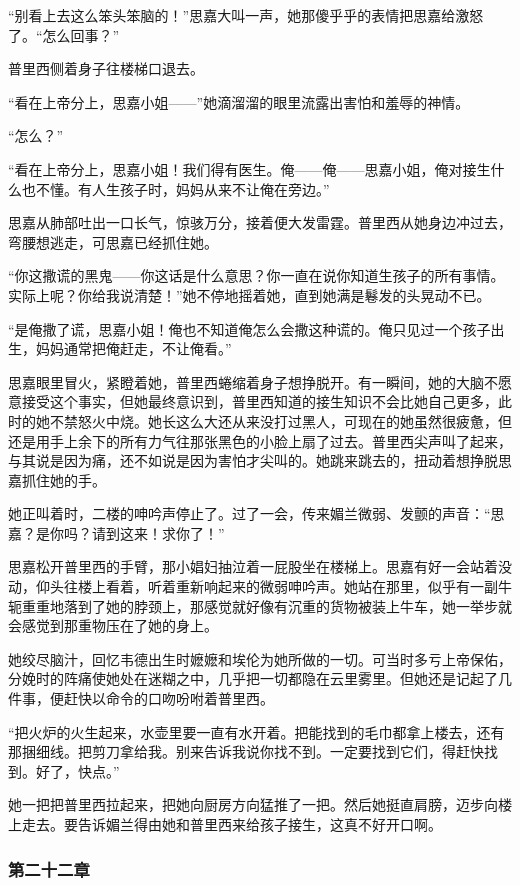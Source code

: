 \par “别看上去这么笨头笨脑的！”思嘉大叫一声，她那傻乎乎的表情把思嘉给激怒了。“怎么回事？”
\par 普里西侧着身子往楼梯口退去。
\par “看在上帝分上，思嘉小姐——”她滴溜溜的眼里流露出害怕和羞辱的神情。
\par “怎么？”
\par “看在上帝分上，思嘉小姐！我们得有医生。俺——俺——思嘉小姐，俺对接生什么也不懂。有人生孩子时，妈妈从来不让俺在旁边。”
\par 思嘉从肺部吐出一口长气，惊骇万分，接着便大发雷霆。普里西从她身边冲过去，弯腰想逃走，可思嘉已经抓住她。
\par “你这撒谎的黑鬼——你这话是什么意思？你一直在说你知道生孩子的所有事情。实际上呢？你给我说清楚！”她不停地摇着她，直到她满是鬈发的头晃动不已。
\par “是俺撒了谎，思嘉小姐！俺也不知道俺怎么会撒这种谎的。俺只见过一个孩子出生，妈妈通常把俺赶走，不让俺看。”
\par 思嘉眼里冒火，紧瞪着她，普里西蜷缩着身子想挣脱开。有一瞬间，她的大脑不愿意接受这个事实，但她最终意识到，普里西知道的接生知识不会比她自己更多，此时的她不禁怒火中烧。她长这么大还从来没打过黑人，可现在的她虽然很疲惫，但还是用手上余下的所有力气往那张黑色的小脸上扇了过去。普里西尖声叫了起来，与其说是因为痛，还不如说是因为害怕才尖叫的。她跳来跳去的，扭动着想挣脱思嘉抓住她的手。
\par 她正叫着时，二楼的呻吟声停止了。过了一会，传来媚兰微弱、发颤的声音：“思嘉？是你吗？请到这来！求你了！”
\par 思嘉松开普里西的手臂，那小娼妇抽泣着一屁股坐在楼梯上。思嘉有好一会站着没动，仰头往楼上看着，听着重新响起来的微弱呻吟声。她站在那里，似乎有一副牛轭重重地落到了她的脖颈上，那感觉就好像有沉重的货物被装上牛车，她一举步就会感觉到那重物压在了她的身上。
\par 她绞尽脑汁，回忆韦德出生时嬷嬷和埃伦为她所做的一切。可当时多亏上帝保佑，分娩时的阵痛使她处在迷糊之中，几乎把一切都隐在云里雾里。但她还是记起了几件事，便赶快以命令的口吻吩咐着普里西。
\par “把火炉的火生起来，水壶里要一直有水开着。把能找到的毛巾都拿上楼去，还有那捆细线。把剪刀拿给我。别来告诉我说你找不到。一定要找到它们，得赶快找到。好了，快点。”
\par 她一把把普里西拉起来，把她向厨房方向猛推了一把。然后她挺直肩膀，迈步向楼上走去。要告诉媚兰得由她和普里西来给孩子接生，这真不好开口啊。

\subsubsection{第二十二章}

